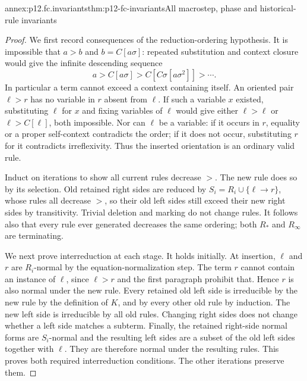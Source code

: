 \begin{annexitem}{annex:p12.fc.invariants}{thm:p12-fc-invariants}{All macrostep, phase and historical-rule invariants}
\begin{proof}
We first record consequences of the reduction-ordering hypothesis.
It is impossible that \(a>b\) and \(b=C[a\sigma]\): repeated
substitution and context closure would give the infinite descending
sequence
\[
 a>C[a\sigma]>C[C\sigma[a\sigma^2]]>\cdots.
\]
In particular a term cannot exceed a context containing itself.
An oriented pair \(\ell>r\) has no variable in \(r\) absent
from \(\ell\). If such a variable \(x\) existed, substituting
\(\ell\) for \(x\) and fixing variables of \(\ell\) would
give either \(\ell>\ell\) or \(\ell>C[\ell]\), both
impossible. Nor can \(\ell\) be a variable: if it occurs in
\(r\), equality or a proper self-context contradicts the order;
if it does not occur, substituting \(r\) for it contradicts
irreflexivity. Thus the inserted orientation is an ordinary valid rule.

Induct on iterations to show all current rules decrease \(>\).
The new rule does so by its selection. Old retained right sides
are reduced by \(S_i=R_i\cup\{\ell\to r\}\), whose rules
all decrease \(>\), so their old left sides still exceed their
new right sides by transitivity. Trivial deletion and marking do
not change rules. It follows also that every rule ever generated
decreases the same ordering; both \(R_*\) and \(R_\infty\)
are terminating.

We next prove interreduction at each stage. It holds initially.
At insertion, \(\ell\) and \(r\) are \(R_i\)-normal by
the equation-normalization step. The term \(r\) cannot contain
an instance of \(\ell\), since \(\ell>r\) and the first
paragraph prohibit that. Hence \(r\) is also normal under the
new rule. Every retained old left side is irreducible by the new
rule by the definition of \(K\), and by every other old rule
by induction. The new left side is irreducible by all old rules.
Changing right sides does not change whether a left side matches
a subterm. Finally, the retained right-side normal forms are
\(S_i\)-normal and the resulting left sides are a subset of
the old left sides together with \(\ell\). They are therefore
normal under the resulting rules. This proves both required
interreduction conditions. The other iterations preserve them.


\end{proof}
\end{annexitem}
